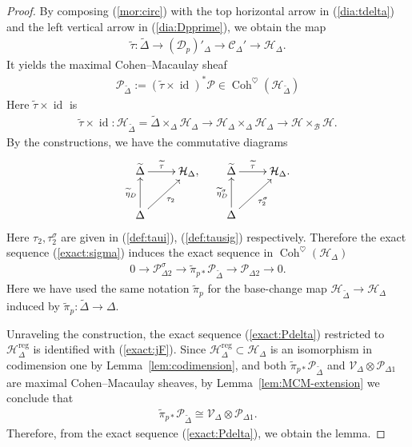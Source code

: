 \documentclass[11pt,oneside,a4paper,mathscr]{amsart}
\theoremstyle{definition}
\newcommand{\cH}{\mathcal{H}}
\newcommand{\cB}{\mathcal{B}}
\newcommand{\cC}{\mathcal{C}}
\newcommand{\cP}{\mathcal{P}}
\newcommand{\cD}{\mathcal{D}}
\newcommand{\Coh}{\operatorname{Coh}}
\newcommand{\id}{\operatorname{id}}
\begin{document}
\begin{proof}
   By composing (\ref{mor:circ}) with the top horizontal arrow in (\ref{dia:tdelta}) and the left vertical arrow in (\ref{dia:Dpprime}), 
   we obtain the map 
   \begin{align*}
       \widetilde{\tau} \colon \widetilde{\Delta} \to (\cD_p)'_{\Delta} \to \cC_{\Delta}' \to \cH_{\Delta}. 
   \end{align*}
   It yields the maximal Cohen--Macaulay sheaf 
   \begin{align*}
       \cP_{\widetilde{\Delta}}:=(\widetilde{\tau}\times \id)^* \cP\in \Coh^{\heartsuit}(\cH_{\widetilde{\Delta}})
       \end{align*}
       Here $\widetilde{\tau}\times \id$ is 
       \begin{align*}
           \widetilde{\tau}\times \id \colon \cH_{\widetilde{\Delta}}=\widetilde{\Delta}\times_{\Delta}\cH_{\Delta} \to 
           \cH_{\Delta}\times_{\Delta} \cH_{\Delta} \to \cH\times_{\cB} \cH.
       \end{align*}
By the constructions, we have the commutative diagrams 
\begin{align*}
    \xymatrix{
\widetilde{\Delta} \ar[r]^-{\widetilde{\tau}} & \cH_{\Delta}, \\
\Delta \ar[u]^-{\widetilde{\eta}_D} \ar[ur]_-{\tau_2} &
    } \quad 
      \xymatrix{
\widetilde{\Delta} \ar[r]^-{\widetilde{\tau}} & \cH_{\Delta}. \\
\Delta \ar[u]^-{\widetilde{\eta}_D^{\sigma}} \ar[ur]_-{\tau_2^{\sigma}} &
    }
\end{align*}
Here $\tau_2, \tau_2^{\sigma}$ are given in (\ref{def:taui}), (\ref{def:tausig}) respectively. 
Therefore the exact sequence (\ref{exact:sigma}) induces the exact
       sequence in $\Coh^{\heartsuit}(\cH_{\Delta})$
       \begin{align}\label{exact:Pdelta}
        0\to \cP_{\Delta 2}^{\sigma} \to \widetilde{\pi}_{p*}\cP_{\widetilde{\Delta}} \to \cP_{\Delta 2} \to 0. 
       \end{align}
       Here we have used the same notation $\widetilde{\pi}_p$ for the 
       base-change map 
       $\cH_{\widetilde{\Delta}} \to \cH_{\Delta}$ induced by 
       $\widetilde{\pi}_p \colon \widetilde{\Delta} \to \Delta$.
       
Unraveling the construction, the exact sequence (\ref{exact:Pdelta}) restricted to 
$\cH_{\Delta}^{\mathrm{reg}}$ is identified with (\ref{exact:jF}). 
Since $\cH_{\Delta}^{\mathrm{reg}} \subset \cH_{\Delta}$ is an isomorphism in codimension one by Lemma~\ref{lem:codimension}, and both $\widetilde{\pi}_{p*}\cP_{\widetilde{\Delta}}$ and $\mathcal{V}_{\Delta}\otimes \cP_{\Delta 1}$ are maximal Cohen--Macaulay sheaves, by Lemma~\ref{lem:MCM-extension} we 
conclude that \begin{align*}
    \widetilde{\pi}_{p*}\cP_{\widetilde{\Delta}}\cong 
   \mathcal{V}_{\Delta}\otimes \cP_{\Delta 1}. 
\end{align*}
Therefore, from the exact sequence (\ref{exact:Pdelta}), we obtain the lemma. 
       
\end{proof}
\end{document}
